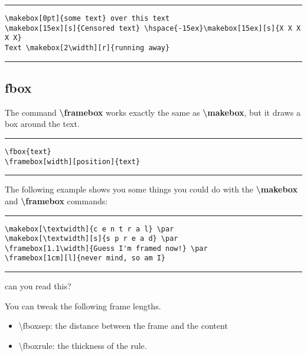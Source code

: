  \hspace{-15ex}

\noindent\vspace{1em}\hrule
\begin{verbatim}
\makebox[0pt]{some text} over this text
\makebox[15ex][s]{Censored text} \hspace{-15ex}\makebox[15ex][s]{X X X X X}
Text \makebox[2\width][r]{running away}
\end{verbatim}
\noindent\hrule\vspace{1em}

\subsection{fbox}
The command \textbf{\textbackslash framebox} works exactly the same as \textbf{\textbackslash makebox}, but it draws a box around the text.

\noindent\vspace{1em}\hrule
\begin{verbatim}
\fbox{text}
\framebox[width][position]{text}
\end{verbatim}
\noindent\hrule\vspace{1em}

The following example shows you some things you could do with the \textbf{\textbackslash makebox} and \textbf{\textbackslash framebox} commands:

 \par
{} \par
{} \par
{}

\noindent\vspace{1em}\hrule
\begin{verbatim}
\makebox[\textwidth]{c e n t r a l} \par
\makebox[\textwidth][s]{s p r e a d} \par
\framebox[1.1\width]{Guess I'm framed now!} \par
\framebox[1cm][l]{never mind, so am I}
\end{verbatim}
\noindent\hrule\vspace{1em}

can you read this?

You can tweak the following frame lengths.
\begin{itemize}
	\item \textbackslash fboxsep: the distance between the frame and the content
	\item \textbackslash fboxrule: the thickness of the rule.
\end{itemize}

